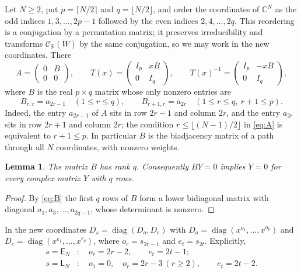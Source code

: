 \documentclass[11pt]{amsart}
\newtheorem{lemma}[theorem]{Lemma}
\theoremstyle{definition}
\theoremstyle{remark}
\numberwithin{equation}{section}
\newcommand{\C}{\mathbb{C}}
\newcommand{\R}{\mathbb{R}}
\newcommand{\diag}{\operatorname{diag}}
\newcommand{\CR}{\mathcal{C}_{\R}}
\newcommand{\sL}{\mathsf{L}}
\newcommand{\sE}{\mathsf{E}}
\begin{document}
Let $N\ge2$, put $p=\lceil N/2\rceil$ and $q=\lfloor N/2\rfloor$, and order
the coordinates of $\C^N$ as the odd indices $1,3,\dots,2p-1$ followed by
the even indices $2,4,\dots,2q$. This reordering is a conjugation by a
permutation matrix; it preserves irreducibility and transforms $\CR(W)$ by
the same conjugation, so we may work in the new coordinates. There
\[
A=\begin{pmatrix}0&B\\0&0\end{pmatrix},\qquad
T(x)=\begin{pmatrix}I_p&xB\\0&I_q\end{pmatrix},\qquad
T(x)^{-1}=\begin{pmatrix}I_p&-xB\\0&I_q\end{pmatrix},
\]
where $B$ is the real $p\times q$ matrix whose only nonzero entries are
\begin{equation}\label{eq:B}
B_{r,r}=a_{2r-1}\quad(1\le r\le q),\qquad
B_{r+1,r}=a_{2r}\quad(1\le r\le q,\ r+1\le p).
\end{equation}
Indeed, the entry $a_{2r-1}$ of $A$ sits in row $2r-1$ and column $2r$, and
the entry $a_{2r}$ sits in row $2r+1$ and column $2r$; the condition
$r\le\lfloor(N-1)/2\rfloor$ in \eqref{eq:A} is equivalent to $r+1\le p$.
In particular $B$ is the biadjacency matrix of a path through all $N$
coordinates, with nonzero weights.

\begin{lemma}\label{lem:rank}
The matrix $B$ has rank $q$. Consequently $BY=0$ implies $Y=0$ for every
complex matrix $Y$ with $q$ rows.
\end{lemma}

\begin{proof}
By \eqref{eq:B} the first $q$ rows of $B$ form a lower bidiagonal matrix
with diagonal $a_1,a_3,\dots,a_{2q-1}$, whose determinant is nonzero.
\end{proof}

In the new coordinates $D_s=\diag(D_o,D_e)$ with
$D_o=\diag(x^{o_1},\dots,x^{o_p})$ and $D_e=\diag(x^{e_1},\dots,x^{e_q})$,
where $o_r=s_{2r-1}$ and $e_t=s_{2t}$. Explicitly,
\begin{equation}\label{eq:exponents}
\begin{aligned}
s=\sE_N&\colon\quad o_r=2r-2,\qquad e_t=2t-1;\\
s=\sL_N&\colon\quad o_1=0,\quad o_r=2r-3\ (r\ge2),\qquad e_t=2t-2.
\end{aligned}
\end{equation}
\end{document}
